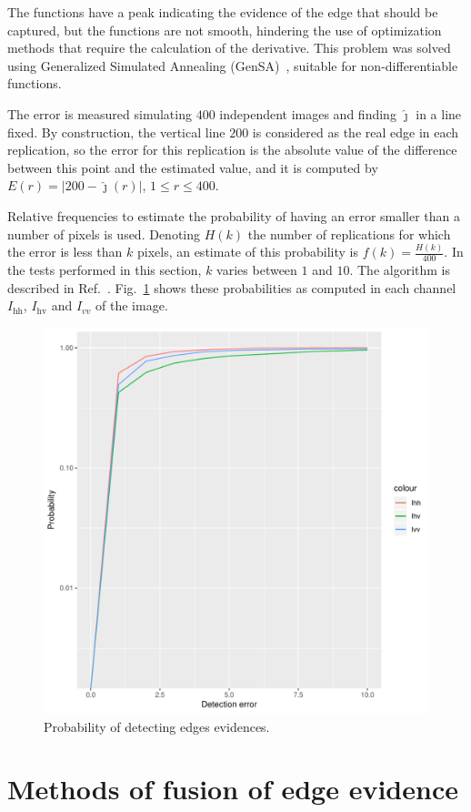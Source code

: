 \documentclass[conference]{IEEEtran}
\begin{document}
The functions have a peak indicating the evidence of the edge that should be captured, but the functions are not smooth, hindering the use of optimization methods that require the calculation of the derivative.
This problem was solved using Generalized Simulated Annealing (GenSA)~\cite{xgsh}, suitable for non-differentiable functions.
    
The error is measured simulating $400$ independent images and finding $\widehat\jmath$ in a line fixed.
By construction, the vertical line $200$ is considered as the real edge in each replication, so the error for this replication is the absolute value of the difference between this point and the estimated value, and it is computed by $E(r) = |200 - \widehat{\jmath}(r)|$, $1\leq r \leq 400$.

Relative frequencies to estimate the probability of having an error smaller than a number of pixels is used. 
Denoting $H(k)$ the number of replications for which the error is less than $k$ pixels, an estimate of this probability is $f(k)=\frac{H(k)}{400}$. 
In the tests performed in this section, $k$ varies between $1$ and $10$. 
The algorithm is described in Ref.~\cite{fbgm}.
Fig.~\ref{probability_edge_detc} shows these probabilities as computed in each channel $I_\text{hh}$, $I_\text{hv}$ and $I_{vv}$ of the image. 
  
\begin{figure}[hbt]
	\centering
	\includegraphics[width=.7\linewidth]{metricas_ihh_ivh_ivv_nhfc_artigos}%
	\caption{Probability of detecting edges evidences.}
\label{probability_edge_detc}
\end{figure}

\section{Methods of fusion of edge evidence}\label{sec_07}
\end{document}
